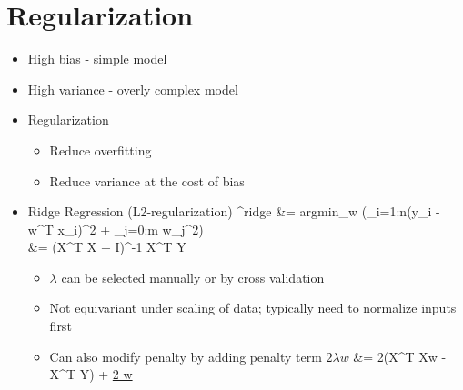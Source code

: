 \documentclass[12pt]{article}
\newenvironment{eqn}{\equation\alignedat{3}}{\endalignedat\endequation}
\begin{document}
\section{Regularization}

\begin{itemize}
	\item High bias - simple model
	\item High variance - overly complex model
	\item Regularization 
	\begin{itemize}
		\item Reduce overfitting 
		\item Reduce variance at the cost of bias
	\end{itemize}
	\item Ridge Regression (L2-regularization)
	\begin{eqn}
		^{ridge} &= argmin_w (\Sigma_{i=1:n}(y_i - w^T x_i)^2 + \lambda \Sigma_{j=0:m} w_j^2) \\
		&= (X^T X + \lambda I)^{-1} X^T Y
	\end{eqn}
	\begin{itemize}
		\item $\lambda$ can be selected manually or by cross validation
		\item Not equivariant under scaling of data; typically need to normalize inputs first
		\item Can also modify penalty by adding penalty term $2\lambda w$
		\begin{eqn}
			 &= 2(X^T Xw - X^T Y) + \underline{2 \lambda w}
		\end{eqn}
	\end{itemize}
\end{itemize}
\end{document}
